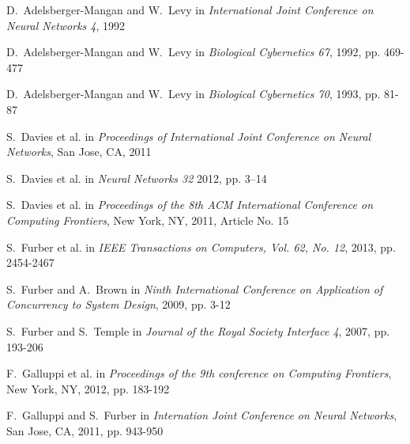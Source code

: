 \documentclass[journal]{./sty/IEEEtran}
\begin{document}

%
%
%


\begin{thebibliography}{22}

D.~Adelsberger-Mangan and W.~Levy in \emph{International Joint Conference on Neural Networks 4}, 1992

D.~Adelsberger-Mangan and W.~Levy in \emph{Biological Cybernetics 67}, 1992, pp. 469-477

D.~Adelsberger-Mangan and W.~Levy in \emph{Biological Cybernetics 70}, 1993, pp. 81-87

S.~Davies et al. in \emph{Proceedings of International Joint Conference on Neural Networks}, San Jose, CA, 2011

S.~Davies et al. in \emph{Neural Networks 32} 2012, pp. 3–14

S.~Davies et al. in \emph{Proceedings of the 8th ACM International Conference on Computing Frontiers}, New York, NY, 2011, Article No. 15 

S.~Furber et al. in \emph{IEEE Transactions on Computers, Vol. 62, No. 12}, 2013, pp. 2454-2467

S.~Furber and A.~Brown in \emph{Ninth International Conference on Application of Concurrency to System Design}, 2009, pp. 3-12

S.~Furber and S.~Temple in \emph{Journal of the Royal Society Interface 4}, 2007, pp. 193-206

F.~Galluppi et al. in \emph{Proceedings of the 9th conference on Computing Frontiers}, New York, NY, 2012, pp. 183-192

F.~Galluppi and S.~Furber in \emph{Internation Joint Conference on Neural Networks}, San Jose, CA, 2011, pp. 943-950 


\end{thebibliography}
\end{document}
